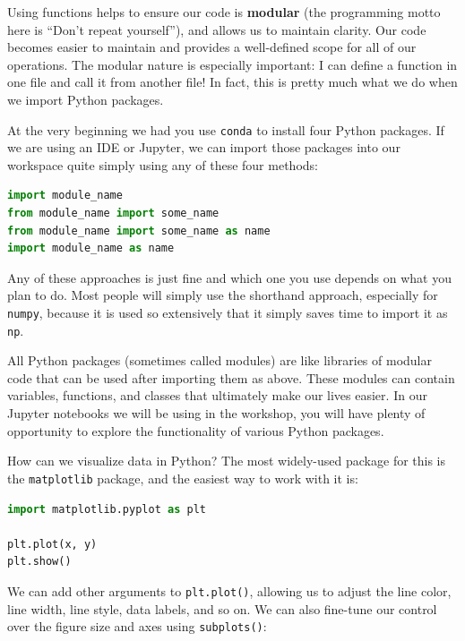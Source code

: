 \documentclass{tufte-book}
\begin{document}
Using functions helps to ensure our code is \textbf{modular} (the programming motto here is ``Don't repeat yourself''), and allows us to maintain clarity. Our code becomes easier to maintain and provides a well-defined scope for all of our operations. The modular nature is especially important: I can define a function in one file and call it from another file! In fact, this is pretty much what we do when we import Python packages.

At the very beginning we had you use \verb|conda| to install four Python packages. If we are using an IDE or Jupyter, we can import those packages into our workspace quite simply using any of these four methods:

\begin{lstlisting}[language=Python, showstringspaces=false,backgroundcolor=\color{lightgray}]
import module_name
from module_name import some_name
from module_name import some_name as name
import module_name as name
\end{lstlisting}

Any of these approaches is just fine and which one you use depends on what you plan to do. Most people will simply use the shorthand approach, especially for \verb|numpy|, because it is used so extensively that it simply saves time to import it as \verb|np|. 

All Python packages (sometimes called modules) are like libraries of modular code that can be used after importing them as above. These modules can contain variables, functions, and classes that ultimately make our lives easier. In our Jupyter notebooks we will be using in the workshop, you will have plenty of opportunity to explore the functionality of various Python packages. 


How can we visualize data in Python? The most widely-used package for this is the \verb|matplotlib| package, and the easiest way to work with it is:

\begin{lstlisting}[language=Python, backgroundcolor=\color{lightgray}]
import matplotlib.pyplot as plt

plt.plot(x, y)
plt.show()
\end{lstlisting}

We can add other arguments to \verb|plt.plot()|, allowing us to adjust the line color, line width, line style, data labels, and so on. We can also fine-tune our control over the figure size and axes using \verb|subplots()|:
\end{document}
